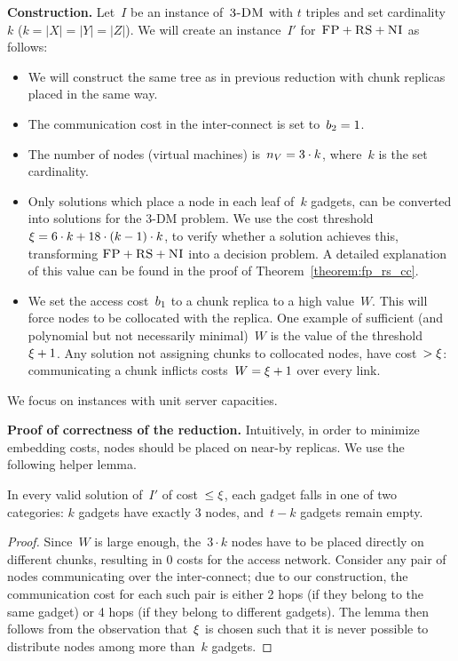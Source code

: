 \textbf{Construction.}
Let~$I$ be an instance of~$\textsc{3-DM}$ with $t$ triples and set cardinality $k$ ($k = |X| = |Y| = |Z|$). We will create an instance~$I'$
for~$\textsc{FP}+\textsc{RS}+\textsc{NI}$ as follows:
\begin{itemize}
\item We will construct the same tree as in previous reduction with
chunk replicas placed in the same way.
\item The communication cost in the inter-connect is set to~$b_2 = 1$.
\item The number of nodes (virtual machines) is~$n_V = 3 \cdot k$, where~$k$ is the set cardinality.
\item Only solutions which place a node in each leaf of~$k$ gadgets, can
be converted into solutions for the 3-DM problem. We use the cost threshold
$\xi =  6 \cdot k + 18 \cdot
(k - 1) \cdot k$, to verify whether a solution achieves this, transforming
$\textsc{FP}+\textsc{RS}+\textsc{NI}$ into a decision problem. A detailed explanation of this value can
be found in the proof of Theorem~\ref{theorem:fp_rs_cc}.
\item We set the access cost~$b_1$ to a chunk replica to a high value~$W$. This will force
nodes to be collocated with the replica. One example of sufficient
(and polynomial but not necessarily minimal)~$W$
is the value of the threshold~$\xi+1$. Any solution not
assigning chunks to collocated nodes, have cost~$> \xi$:
communicating a chunk inflicts costs~$W=\xi+1$ over every link.
\end{itemize}

We focus on instances with unit server capacities.

\textbf{Proof of correctness of the reduction.}
Intuitively, in order to minimize embedding costs,
nodes should be placed on near-by replicas. We use the following
helper lemma.
\begin{lemma}\label{lemma:helper}
In every valid solution of~$I'$ of cost~$\leq \xi$, each gadget
falls in one of two categories:
$k$ gadgets have exactly
$3$ nodes, and~$t-k$ gadgets remain empty.
\end{lemma}
\begin{proof}
Since~$W$ is large enough, the~$3\cdot k$ nodes have to be placed
directly on different chunks, resulting in 0 costs for the access network.
Consider any pair of nodes
communicating over the
inter-connect; due to our construction, the communication cost
for each such pair is either
2 hops (if they belong to the same gadget) or 4 hops (if they belong
to different gadgets).
The lemma then follows from the observation that~$\xi$
is chosen such that it is never possible to distribute nodes
among more than~$k$ gadgets.
\end{proof}

